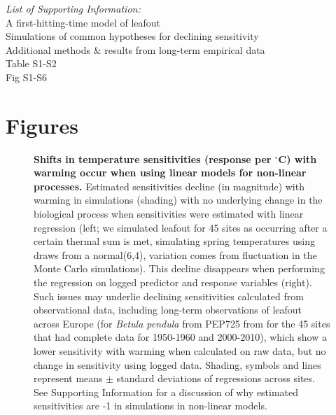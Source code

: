 \documentclass[11pt,letter]{article}
\begin{document}
\emph{List of Supporting Information:}\\
A first-hitting-time model of leafout\\
Simulations of common hypotheses for declining sensitivity\\
Additional methods \& results from long-term empirical data\\
Table S1-S2\\
Fig S1-S6

\newpage
\section* {Figures}

\begin{figure}[h!]
\centering
\caption{\textbf{Shifts in temperature sensitivities (response per $^{\circ}$C) with warming occur when using linear models for non-linear processes.} Estimated sensitivities decline (in magnitude) with warming in simulations (shading) with no underlying change in the biological process when sensitivities were estimated with linear regression (left; we simulated leafout for 45 sites as occurring after a certain thermal sum is met, simulating spring temperatures using draws from a normal(6,4), variation comes from fluctuation in the Monte Carlo simulations). This decline disappears when performing the regression on logged predictor and response variables (right). Such issues may underlie declining sensitivities calculated from observational data, including long-term observations of leafout across Europe (for \emph{Betula pendula} from PEP725 from for the 45 sites that had complete data for 1950-1960 and 2000-2010), which show a lower sensitivity with warming when calculated on raw data, but no change in sensitivity using logged data. Shading, symbols and lines represent means $\pm$ standard deviations of regressions across sites. See Supporting Information for a discussion of why estimated sensitivities are -1 in simulations in non-linear models.} 
\label{fig:basicsimswpep} %
\end{figure}
\end{document}
